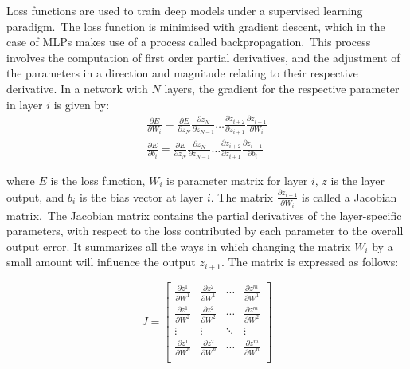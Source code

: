 \noindent Loss functions are used to train deep models under a supervised learning paradigm.\ The loss function is minimised with gradient descent, which in the case of MLPs makes use of a process called backpropagation.\ This process involves the computation of first order partial derivatives, and the adjustment of the parameters in a direction and magnitude relating to their respective derivative. In a network with $ N $ layers, the gradient for the respective parameter in layer $ i $ is given by:
\begin{subequations}
	\begin{gather}
		\frac{\partial E} {\partial W_i} = \frac{\partial E} {\partial z_N}\frac{\partial z_N} {\partial z_{N - 1}}  \dots \frac{\partial z_{i + 2}} {\partial z_{i + 1}}\frac{\partial z_{i + 1}} {\partial W_{i}} \\
		\frac{\partial E} {\partial b_i} = \frac{\partial E} {\partial z_N}\frac{\partial z_N} {\partial z_{N - 1}}  \dots \frac{\partial z_{i + 2}} {\partial z_{i + 1}}\frac{\partial z_{i + 1}} {\partial b_{i}}
	\end{gather}
\end{subequations}

\noindent where $ E $ is the loss function, $ W_i $ is parameter matrix for layer $ i $, $ z $ is the layer output, and $ b_i $ is the bias vector at layer $ i $. The matrix $ \frac{\partial z_{i + 1}} {\partial W_i} $ is called a Jacobian matrix.\ The Jacobian matrix contains the partial derivatives of the layer-specific parameters, with respect to the loss contributed by each parameter to the overall output error. It summarizes all the ways in which changing the matrix $ W_i $ by a small amount will influence the output $ z_{i + 1} $. The matrix is expressed as follows: \par
\begin{equation}
	\renewcommand\arraystretch{2}
	J = \begin{bmatrix}
        		\frac{\partial z^1}{\partial W^1} & \frac{\partial z^2}{\partial W^1} & \cdots & \frac{\partial z^m}{\partial W^1} \\
           	\frac{\partial z^1}{\partial W^2} &\frac{\partial z^2}{\partial W^2} & \cdots & \frac{\partial z^m}{\partial W^2} \\
           	\vdots & \vdots & \ddots & \vdots \\
           	\frac{\partial z^1}{\partial W^n} & \frac{\partial z^2}{\partial W^n} & \cdots & \frac{\partial z^m}{\partial W^n} \\
        \end{bmatrix}
\end{equation}

